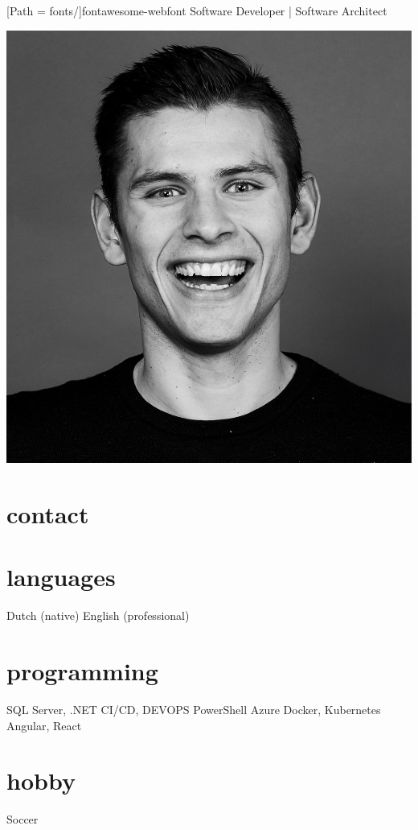 \documentclass[]{friggeri-cv}
\begin{document}
\newfontfamily{\FA}[Path = fonts/]{fontawesome-webfont}
       {Software Developer | Software Architect}

\begin{aside}
  \includegraphics[width=\textwidth]{profilePicture.jpg}
  \section{contact}
    \href{https://www.google.com/maps/place/Tilburg/@51.5737217,4.9686496,12z}{{\FA \faMapMarker}}
    \href{mailto:pietervdheijden@gmail.com}{{\FA \faEnvelope}}
    \href{https://nl.linkedin.com/in/pietervdheijden}{{\FA \faLinkedin}}
    \href{https://github.com/pietervdheijden}{{\FA \faGithub}}
  \section{languages}
    Dutch (native)
    English (professional)
  \section{programming}
    {SQL Server, .NET}
    {CI/CD, DEVOPS}
    {PowerShell}
    {Azure}
    {Docker, Kubernetes}
    {Angular, React}
  \section{hobby}
    Soccer
\end{aside}
\end{document}
